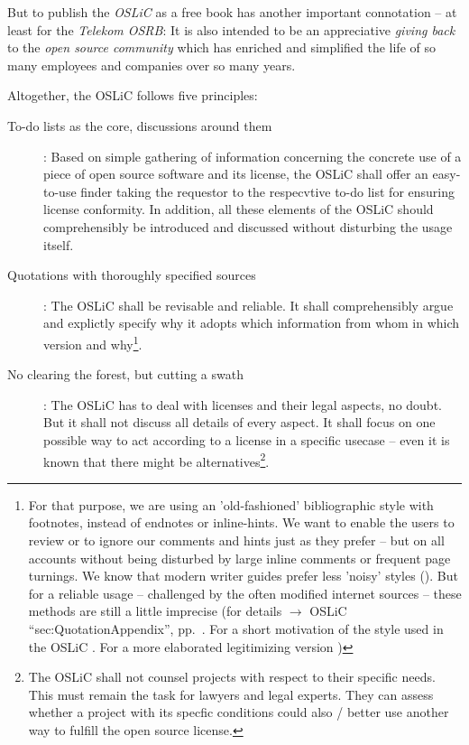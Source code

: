 But to publish the \emph{OSLiC} as a free book has another important connotation --
at least for the \emph{Telekom OSRB}: It is also intended to be an appreciative
\emph{giving back} to the \emph{open source community} which has enriched and
simplified the life of so many employees and companies over so many years.

Altogether, the OSLiC follows five principles:

\begin{description}
  \item[To-do lists as the core, discussions around them]: Based on simple
  gathering of information concerning the concrete use of a piece of open source
  software and its license, the OSLiC shall offer an easy-to-use finder taking
  the requestor to the respecvtive to-do list for ensuring license conformity.
  In addition, all these elements of the OSLiC should comprehensibly be
  introduced and discussed without disturbing the usage itself.

  \item[Quotations with thoroughly specified sources]\label{QuotationPrinciple}:
  The OSLiC shall be revisable and reliable. It shall comprehensibly argue and
  explictly specify why it adopts which information from whom in which version
  and why\footnote{For that purpose, we are using an 'old-fashioned'
  bibliographic style with footnotes, instead of endnotes or inline-hints.
  We want to enable the users to review or to ignore our comments and hints just
  as they prefer -- but on all accounts without being disturbed by large inline
  comments or frequent page turnings. We know that modern writer guides prefer
  less 'noisy' styles (\cite[pars pro toto cf.][\nopage passim]{Mla2009a}). But
  for a reliable usage -- challenged by the often modified internet sources --
  these methods are still a little imprecise (for details $\rightarrow$ OSLiC
  \enquote{sec:QuotationAppendix}, pp.\ \pageref{sec:QuotationAppendix}. For a
  short motivation of the style used in the OSLiC \cite[cf.][\nopage
  passim]{Reincke2012a}. For a more elaborated legitimizing version
  \cite[cf.][\nopage passim]{Reincke2012b}) }.

 \item[No clearing the forest, but cutting a swath]: The OSLiC
  has to deal with licenses and their legal aspects, no doubt. But it shall not
  discuss all details of every aspect. It shall focus on one possible way to act
  according to a license in a specific usecase -- even it is known that there
  might be alternatives\footnote{The OSLiC shall not counsel projects with
  respect to their specific needs. This must remain the task for lawyers and
  legal experts. They can assess whether a project with its specfic conditions
  could also / better use another way to fulfill the open source license.}.
  

\end{description}
